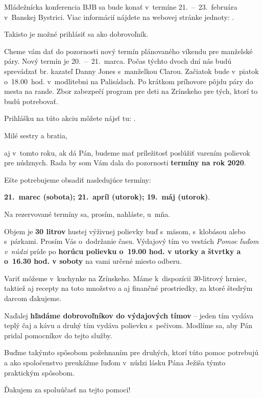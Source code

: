 Mládežnícka konferencia BJB sa bude konať v~termíne 21.~--~23.~februára v~Banskej Bystrici. Viac informácií nájdete na webovej stránke jednoty: .

Takisto je možné prihlásiť sa ako dobrovoľník.


Cheme vám dať do pozornosti nový termín plánovaného víkendu pre manželské páry. Nový termín je 20.~--~21.~marca. Počas týchto dvoch dní nás budú sprevádzať br. kazateľ Danny Jones s~manželkou Clarou. Začiatok bude v~piatok o~18.00~hod. v~modlitebni na Palisádach. Po krátkom príhovore pôjdu páry do mesta na rande. Zbor zabezpečí program pre deti na Zrínskeho pre tých, ktorí to budú potrebovať.

Prihlášku na túto akciu môžete nájsť tu: .


Milé sestry a bratia,

aj v~tomto roku, ak dá Pán, budeme mať príležitosť poslúžiť varením polievok pre núdznych. Rada by som Vám dala do pozornosti {\bf termíny na rok 2020}.

Ešte potrebujeme obsadiť nasledujúce termíny:

{\bf 21.~marec (sobota); 21.~apríl (utorok); 19.~máj (utorok)}.

Na rezervované termíny sa, prosím, nahláste, u~mňa.

Objem je {\bf 30 litrov} hustej výživnej polievky buď s~mäsom, s~klobásou alebo s~párkami. Prosím Vás o~dodržanie času. Výdajový tím vo vestách {\it Pomoc ľuďom v~núdzi} príde po {\bf horúcu polievku o~19.00 hod. v utorky a štvrtky a o~16.30 hod. v soboty} na vami určené miesto odberu.

Variť môžeme v~kuchynke na Zrínskeho. Máme k~dispozícii 30-litrový hrniec, taktiež aj recepty na toto množstvo a aj finančné prostriedky, za ktoré štedrým darcom ďakujeme.

Naďalej {\bf hľadáme dobrovoľníkov do výdajových tímov} -- jeden tím vydáva teplý čaj a kávu a druhý tím vydáva polievku s~pečivom. Modlíme sa, aby Pán pridal pomocníkov do tejto služby.

Buďme takýmto spôsobom požehnaním pre druhých, ktorí túto pomoc potrebujú a ako spoločenstvo preukážme ľuďom v~núdzi lásku Pána Ježiša týmto praktickým spôsobom.

Ďakujem za spoluúčasť na tejto pomoci!


